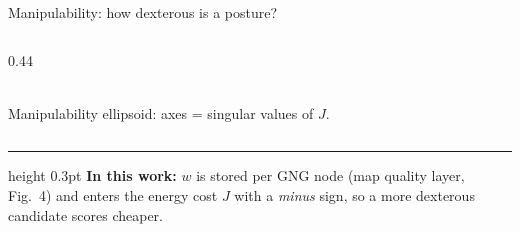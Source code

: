 \begin{frame}{Manipulability: how dexterous is a posture?}
\begin{columns}[T]
\begin{column}{0.44\textwidth}
      \\[0.3em]
      {\scriptsize Manipulability ellipsoid: axes = singular values of $J$.}
    \end{column}
  \end{columns}
  \vspace{0.4em}
  \hrule height 0.3pt
  \vspace{0.3em}
  {\footnotesize \textbf{In this work:} $w$ is stored per GNG node (map quality
  layer, Fig.~4) and enters the energy cost $J$ with a \emph{minus} sign, so a more
  dexterous candidate scores cheaper.}
\end{frame}


